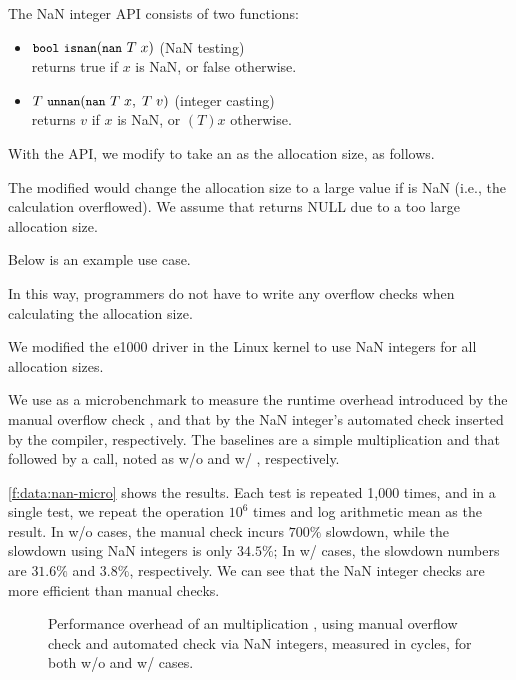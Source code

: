 \noindent
The NaN integer API consists of two functions:
\begin{itemize}
\item
$\cc{bool}\ \cc{isnan}(\cc{nan}\ T\; x)$ \hfill (NaN testing) \\
returns true if $x$ is NaN, or false otherwise.
\item
$T\ \cc{unnan}(\cc{nan}\ T\; x,\; T\; v)$ \hfill (integer casting) \\
returns $v$ if $x$ is NaN, or $(T)x$ otherwise.
\end{itemize}
With the API, we modify  to take an  as
the allocation size, as follows.

The modified  would change the allocation size to a large
value  if  is NaN (i.e., the calculation
overflowed).  We assume that  returns
NULL due to a too large allocation size.

Below is an example use case.

In this way, programmers do not have to write any overflow checks
when calculating the allocation size.

We modified the e1000 driver in the Linux kernel to use NaN integers
for all allocation sizes.

We use  as a microbenchmark to measure the runtime
overhead introduced by the manual overflow check , and that by the NaN integer's automated check
inserted by the compiler, respectively.
%
The baselines are a simple multiplication and that followed by a
 call, noted as w/o and w/ , respectively.

\autoref{f:data:nan-micro} shows the results. Each test is repeated 1,000 times,
and in a single test, we repeat the operation $10^6$ times and log arithmetic mean
as the result.
%
In w/o  cases, the manual check incurs $700\%$ slowdown, while
the slowdown using NaN integers is only $34.5\%$;
%
In w/  cases, the slowdown numbers are $31.6\%$ and $3.8\%$,
respectively.
%
We can see that the NaN integer checks are more efficient than
manual checks.

\begin{figure}
\centering

\caption{Performance overhead of an multiplication , using
manual overflow check  and automated
check via NaN integers, measured in cycles, for both w/o and w/  cases.}
\label{f:data:nan-micro}
\end{figure}

